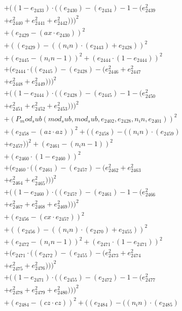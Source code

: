 \documentclass[10pt, a4paper]{article}
\begin{document}
\begin{align*}
& + ((1 - e_{2433})  \cdot  ((e_{2430}) - (e_{2434}) - 1 - (e_{2439}^{2} \\
& + e_{2440}^{2} + e_{2441}^{2} + e_{2442}^{2})))^{2} \\
& + (e_{2429} - (ax  \cdot  e_{2430}))^{2} \\
& + ((e_{2429}) - ((n_in)  \cdot  (e_{2443}) + e_{2428}))^{2} \\
& + (e_{2445} - (n_in - 1))^{2} + (e_{2444}  \cdot  (1 - e_{2444}))^{2} \\
& + (e_{2444}  \cdot  ((e_{2445}) - (e_{2428}) - (e_{2446}^{2} + e_{2447}^{2} \\
& + e_{2448}^{2} + e_{2449}^{2})))^{2} \\
& + ((1 - e_{2444})  \cdot  ((e_{2428}) - (e_{2445}) - 1 - (e_{2450}^{2} \\
& + e_{2451}^{2} + e_{2452}^{2} + e_{2453}^{2})))^{2} \\
& + (P_mod_sub(mod_sub, mod_sub, e_{2402}, e_{2428}, n_in, e_{2401}))^{2} \\
& + (e_{2458} - (az  \cdot  az))^{2} + ((e_{2458}) - ((n_in)  \cdot  (e_{2459}) \\
& + e_{2457}))^{2} + (e_{2461} - (n_in - 1))^{2} \\
& + (e_{2460}  \cdot  (1 - e_{2460}))^{2} \\
& + (e_{2460}  \cdot  ((e_{2461}) - (e_{2457}) - (e_{2462}^{2} + e_{2463}^{2} \\
& + e_{2464}^{2} + e_{2465}^{2})))^{2} \\
& + ((1 - e_{2460})  \cdot  ((e_{2457}) - (e_{2461}) - 1 - (e_{2466}^{2} \\
& + e_{2467}^{2} + e_{2468}^{2} + e_{2469}^{2})))^{2} \\
& + (e_{2456} - (cx  \cdot  e_{2457}))^{2} \\
& + ((e_{2456}) - ((n_in)  \cdot  (e_{2470}) + e_{2455}))^{2} \\
& + (e_{2472} - (n_in - 1))^{2} + (e_{2471}  \cdot  (1 - e_{2471}))^{2} \\
& + (e_{2471}  \cdot  ((e_{2472}) - (e_{2455}) - (e_{2473}^{2} + e_{2474}^{2} \\
& + e_{2475}^{2} + e_{2476}^{2})))^{2} \\
& + ((1 - e_{2471})  \cdot  ((e_{2455}) - (e_{2472}) - 1 - (e_{2477}^{2} \\
& + e_{2478}^{2} + e_{2479}^{2} + e_{2480}^{2})))^{2} \\
& + (e_{2484} - (cz  \cdot  cz))^{2} + ((e_{2484}) - ((n_in)  \cdot  (e_{2485}) \\

\end{align*}
\end{document}
